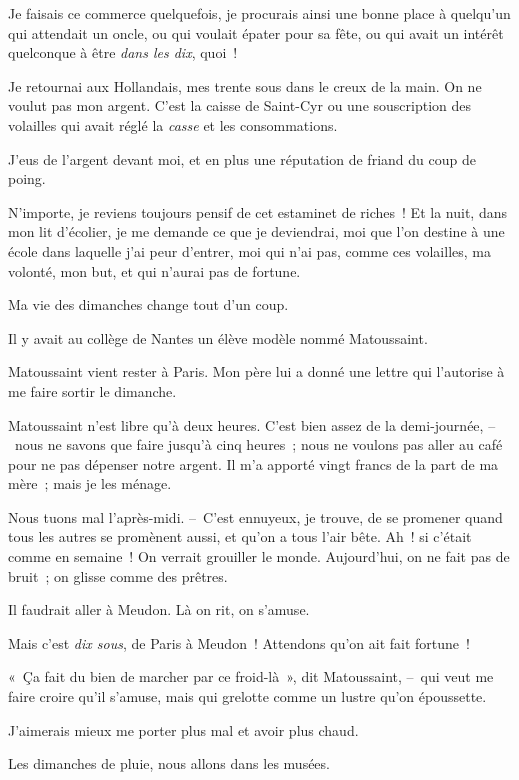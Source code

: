 \documentclass[french,twoside]{book} %
\begin{document}
Je faisais ce commerce quelquefois, je procurais ainsi une bonne place à quelqu’un qui attendait un oncle, ou qui voulait épater pour sa fête, ou qui avait un intérêt quelconque à être \emph{dans les dix}, quoi !\par
Je retournai aux Hollandais, mes trente sous dans le creux de la main. On ne voulut pas mon argent. C’est la caisse de Saint-Cyr ou une souscription des volailles qui avait réglé la \emph{casse} et les consommations.\par
J’eus de l’argent devant moi, et en plus une réputation de friand du coup de poing.\par
N’importe, je reviens toujours pensif de cet estaminet de riches ! Et la nuit, dans mon lit d’écolier, je me demande ce que je deviendrai, moi que l’on destine à une école dans laquelle j’ai peur d’entrer, moi qui n’ai pas, comme ces volailles, ma volonté, mon but, et qui n’aurai pas de fortune.\par
\bigbreak
\noindent Ma vie des dimanches change tout d’un coup.\par
Il y avait au collège de Nantes un élève modèle nommé Matoussaint.\par
Matoussaint vient rester à Paris. Mon père lui a donné une lettre qui l’autorise à me faire sortir le dimanche.\par
Matoussaint n’est libre qu’à deux heures. C’est bien assez de la demi-journée, – nous ne savons que faire jusqu’à cinq heures ; nous ne voulons pas aller au café pour ne pas dépenser notre argent. Il m’a apporté vingt francs de la part de ma mère ; mais je les ménage.\par
Nous tuons mal l’après-midi. – C’est ennuyeux, je trouve, de se promener quand tous les autres se promènent aussi, et qu’on a tous l’air bête. Ah ! si c’était comme en semaine ! On verrait grouiller le monde. Aujourd’hui, on ne fait pas de bruit ; on glisse comme des prêtres.\par
Il faudrait aller à Meudon. Là on rit, on s’amuse.\par
Mais c’est\emph{ dix sous}, de Paris à Meudon ! Attendons qu’on ait fait fortune !\par
« Ça fait du bien de marcher par ce froid-là », dit Matoussaint, – qui veut me faire croire qu’il s’amuse, mais qui grelotte comme un lustre qu’on époussette.\par
J’aimerais mieux me porter plus mal et avoir plus chaud.\par
Les dimanches de pluie, nous allons dans les musées.\par
\end{document}
